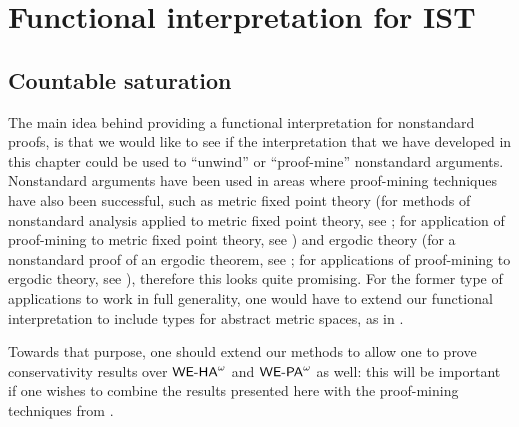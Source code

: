 \section{Functional interpretation for IST}







%




%

\subsection{Countable saturation}\label{ss:dst:csat}

The main idea behind providing a functional interpretation for nonstandard proofs, is that  we would like to see if the interpretation that we have developed in this chapter could be used to ``unwind'' or ``proof-mine'' nonstandard arguments. Nonstandard arguments have been used in areas where proof-mining techniques have also been successful, such as metric fixed point theory (for methods of nonstandard analysis applied to metric fixed point theory, see \cite{aksoykhamsi90, kirk03}; for application of proof-mining to metric fixed point theory, see \cite{briseid09, Gerhardy06, Kohlenbach05fpt, kohlenbachleustean03, kohlenbachleustean10, leustean07}) and ergodic theory (for a nonstandard proof of an ergodic theorem, see \cite{kamae82}; for applications of proof-mining to ergodic theory, see \cite{avigad09, AGT10, gerhardy08, Gerhardy2010, Kohlenbach2011, kohlenbachleustean09, Safarik(11)}), therefore this looks quite promising. For the former type of applications to work in full generality, one would have to extend our functional interpretation to include types for abstract metric spaces, as in \cite{GK08, Kohlenbach05meta}.

Towards that purpose, one should extend our methods to allow one to prove conservativity results over ${\textsf{\upshape WE-HA}}^{\omega}$ and ${\textsf{\upshape WE-PA}}^{\omega}$ as well: this will be important if one wishes to combine the results presented here with the proof-mining techniques from \cite{Kohlenbach08}. 

